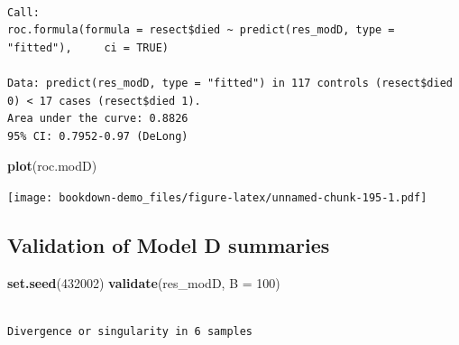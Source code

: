 \documentclass[]{book}
\newenvironment{Shaded}{\begin{snugshade}}{\end{snugshade}}
\newcommand{\KeywordTok}[1]{\textcolor[rgb]{0.13,0.29,0.53}{\textbf{#1}}}
\newcommand{\DataTypeTok}[1]{\textcolor[rgb]{0.13,0.29,0.53}{#1}}
\newcommand{\DecValTok}[1]{\textcolor[rgb]{0.00,0.00,0.81}{#1}}
\newcommand{\StringTok}[1]{\textcolor[rgb]{0.31,0.60,0.02}{#1}}
\newcommand{\OtherTok}[1]{\textcolor[rgb]{0.56,0.35,0.01}{#1}}
\newcommand{\OperatorTok}[1]{\textcolor[rgb]{0.81,0.36,0.00}{\textbf{#1}}}
\newcommand{\NormalTok}[1]{#1}
\theoremstyle{definition}
\theoremstyle{definition}
\theoremstyle{definition}
\theoremstyle{remark}
\begin{document}
\begin{Shaded}
\end{Shaded}

\begin{verbatim}

Call:
roc.formula(formula = resect$died ~ predict(res_modD, type = "fitted"),     ci = TRUE)

Data: predict(res_modD, type = "fitted") in 117 controls (resect$died 0) < 17 cases (resect$died 1).
Area under the curve: 0.8826
95% CI: 0.7952-0.97 (DeLong)
\end{verbatim}

\begin{Shaded}
\begin{Highlighting}[]
\KeywordTok{plot}\NormalTok{(roc.modD)}
\end{Highlighting}
\end{Shaded}

\texttt{[image: bookdown-demo\_files/figure-latex/unnamed-chunk-195-1.pdf]}

\subsection{Validation of Model D
summaries}\label{validation-of-model-d-summaries}

\begin{Shaded}
\begin{Highlighting}[]
\KeywordTok{set.seed}\NormalTok{(}\DecValTok{432002}\NormalTok{)}
\KeywordTok{validate}\NormalTok{(res_modD, }\DataTypeTok{B =} \DecValTok{100}\NormalTok{)}
\end{Highlighting}
\end{Shaded}

\begin{verbatim}

Divergence or singularity in 6 samples
\end{verbatim}
\end{document}
